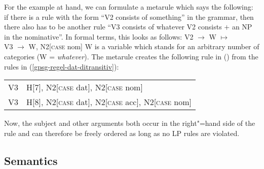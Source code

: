 For the example at hand, we can formulate a metarule which says the following: if there is a rule with the form ``V2 consists of something'' in the grammar,
then there also has to be another rule ``V3 consists of whatever V2 consists $+$ an NP in the nominative''. In formal terms, this looks as follows:
\ea
\label{subjekt-meta}
V2  $\to$ W $\mapsto$\\
V3  $\to$ W, N2[\textsc{case} nom]
\z
W is a variable which stands for an arbitrary number of categories (W = \emph{what\-ever}). The metarule creates the following rule in () from the rules
in (\ref{gpsg-regel-dat-ditransitiv}):
\ea
\begin{tabular}[t]{@{}l@{~$\to$~}l@{}}
V3  & H[7], N2[\textsc{case} dat], N2[\textsc{case} nom]                \\
V3  & H[8], N2[\textsc{case} dat], N2[\textsc{case} acc], N2[\textsc{case} nom]  \\
\end{tabular}
\z

\noindent
Now, the subject and other arguments both occur in the right"=hand side of the rule and can therefore be freely ordered as long as no LP rules are violated.%


\subsection{Semantics}
\label{Sec-GPSG-Sem}


